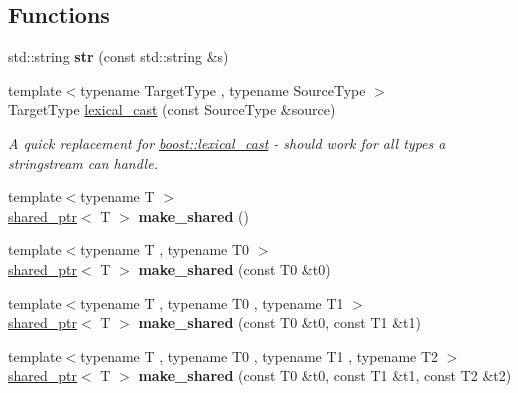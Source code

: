 \subsection*{Functions}
\begin{DoxyCompactItemize}
\item 
\hypertarget{namespaceboost_ad663a56f6196c701942f90794ca14789}{std\+::string {\bfseries str} (const std\+::string \&s)}\label{namespaceboost_ad663a56f6196c701942f90794ca14789}

\item 
\hypertarget{namespaceboost_a19d97ff5320962433a8d0ca7c6e2ad41}{{\footnotesize template$<$typename Target\+Type , typename Source\+Type $>$ }\\Target\+Type \hyperlink{namespaceboost_a19d97ff5320962433a8d0ca7c6e2ad41}{lexical\+\_\+cast} (const Source\+Type \&source)}\label{namespaceboost_a19d97ff5320962433a8d0ca7c6e2ad41}

\begin{DoxyCompactList}\small\item\em A quick replacement for \hyperlink{namespaceboost_a19d97ff5320962433a8d0ca7c6e2ad41}{boost\+::lexical\+\_\+cast} -\/ should work for all types a stringstream can handle. \end{DoxyCompactList}\item 
\hypertarget{namespaceboost_ab12f5638af88bcb0ec011c9a14d24106}{{\footnotesize template$<$typename T $>$ }\\\hyperlink{classboost_1_1shared__ptr}{shared\+\_\+ptr}$<$ T $>$ {\bfseries make\+\_\+shared} ()}\label{namespaceboost_ab12f5638af88bcb0ec011c9a14d24106}

\item 
\hypertarget{namespaceboost_a43c03bc53eac711b97ff928bb904efd9}{{\footnotesize template$<$typename T , typename T0 $>$ }\\\hyperlink{classboost_1_1shared__ptr}{shared\+\_\+ptr}$<$ T $>$ {\bfseries make\+\_\+shared} (const T0 \&t0)}\label{namespaceboost_a43c03bc53eac711b97ff928bb904efd9}

\item 
\hypertarget{namespaceboost_ab2fdc900ea3f21999595f1569083d3bf}{{\footnotesize template$<$typename T , typename T0 , typename T1 $>$ }\\\hyperlink{classboost_1_1shared__ptr}{shared\+\_\+ptr}$<$ T $>$ {\bfseries make\+\_\+shared} (const T0 \&t0, const T1 \&t1)}\label{namespaceboost_ab2fdc900ea3f21999595f1569083d3bf}

\item 
\hypertarget{namespaceboost_aac3b711e2fb9d256a2c9ce5fd95dbc43}{{\footnotesize template$<$typename T , typename T0 , typename T1 , typename T2 $>$ }\\\hyperlink{classboost_1_1shared__ptr}{shared\+\_\+ptr}$<$ T $>$ {\bfseries make\+\_\+shared} (const T0 \&t0, const T1 \&t1, const T2 \&t2)}\label{namespaceboost_aac3b711e2fb9d256a2c9ce5fd95dbc43}


\end{DoxyCompactItemize}

